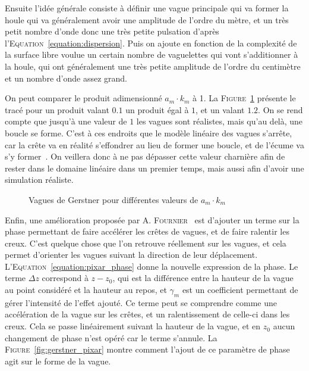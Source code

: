 				Ensuite l'idée générale consiste à définir une vague principale qui va former la houle qui va généralement avoir une amplitude de l'ordre du mètre, et un très petit nombre d'onde donc une très petite pulsation d'après l'\textsc{Equation}~\ref{equation:dispersion}. Puis on ajoute en fonction de la complexité de la surface libre voulue un certain nombre de vaguelettes qui vont s'additionner à la houle, qui ont généralement une très petite amplitude de l'ordre du centimètre et un nombre d'onde assez grand.

				On peut comparer le produit adimensionné $a_m\cdot k_m$ à 1. La \textsc{Figure}~\ref{fig:amkm} présente le tracé pour un produit valant $0.1$ un produit égal à $1$, et un valant $1.2$. On se rend compte que jusqu'à une valeur de $1$ les vagues sont réalistes, mais qu'au delà, une boucle se forme. C'est à ces endroits que le modèle linéaire des vagues s'arrête, car la crête va en réalité s'effondrer au lieu de former une boucle, et de l'écume va s'y former~\cite{Gerstner-Like_Henry, Gerstner_Pixar}. On veillera donc à ne pas dépasser cette valeur charnière afin de rester dans le domaine linéaire dans un premier temps, mais aussi afin d'avoir une simulation réaliste.

				\begin{figure}[!htb]
					\centering
					\caption{Vagues de Gerstner pour différentes valeurs de $a_m\cdot k_m$}
					\label{fig:amkm}
				\end{figure}

				Enfin, une amélioration proposée par A. \textsc{Fournier}~\cite{Gerstner_Pixar} est d'ajouter un terme sur la phase permettant de faire accélérer les crêtes de vagues, et de faire ralentir les creux. C'est quelque chose que l'on retrouve réellement sur les vagues, et cela permet d'orienter les vagues suivant la direction de leur déplacement. L'\textsc{Equation}~\ref{equation:pixar_phase} donne la nouvelle expression de la phase. Le terme $\Delta z$ correspond à $z-z_0$, qui est la différence entre la hauteur de la vague au point considéré et la hauteur au repos, et $\gamma_m$ est un coefficient permettant de gérer l'intensité de l'effet ajouté. Ce terme peut se comprendre comme une accélération de la vague sur les crêtes, et un ralentissement de celle-ci dans les creux. Cela se passe linéairement suivant la hauteur de la vague, et en $z_0$ aucun changement de phase n'est opéré car le terme s'annule. La \textsc{Figure}~\ref{fig:gerstner_pixar} montre comment l'ajout de ce paramètre de phase agit sur le forme de la vague.


